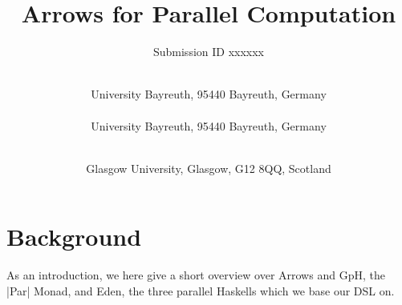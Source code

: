 \documentclass{jfp1}
\title{Arrows for Parallel Computation}
\author{Submission ID xxxxxx}
\author[M. Braun, O. Lobachev, and P. Trinder]%
        {\textls*{MARTIN BRAUN}\\
         University Bayreuth, 95440 Bayreuth, Germany\\
		 \textls*{OLEG LOBACHEV}\\
		 University Bayreuth, 95440 Bayreuth, Germany\\
		 \and\ \textls*{PHIL TRINDER}\\
		 Glasgow University, Glasgow, G12 8QQ, Scotland}
\begin{document}
\label{firstpage}

\def\SymbReg{\textsuperscript{\textregistered}}

\maketitle



\tableofcontents

	
	
	\begin{flushright}
	
	\end{flushright}\section{Background}
	\label{sec:background}
	As an introduction, we here give a short overview over Arrows and GpH, the |Par| Monad, and Eden, the three parallel Haskells which we base our DSL on.
	
	
	
	
	
	
	
	
	
	
        
	
        \appendix
	
\end{document}
